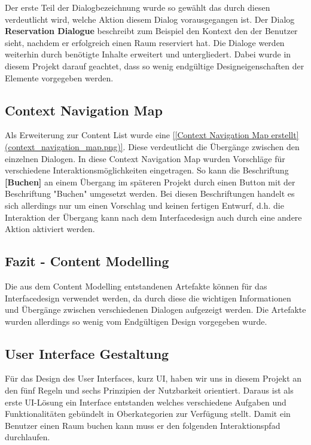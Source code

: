 Der erste Teil der Dialogbezeichnung wurde so gewählt das durch diesen
verdeutlicht wird, welche Aktion diesem Dialog vorausgegangen ist. Der Dialog
\textbf{Reservation Dialogue} beschreibt zum Beispiel den Kontext den der Benutzer
sieht, nachdem er erfolgreich einen Raum reserviert hat.
Die Dialoge werden weiterhin durch benötigte Inhalte erweitert und untergliedert.
Dabei wurde in diesem Projekt darauf geachtet, dass so wenig endgültige
Designeigenschaften der Elemente vorgegeben werden.

\subsection{Context Navigation Map}
\label{sec:Context_Navigation_Map}

Als Erweiterung zur Content List wurde eine \ref{[Context Navigation Map erstellt](context_navigation_map.png)}.
Diese verdeutlicht die Übergänge zwischen den einzelnen Dialogen. In diese
Context Navigation Map wurden Vorschläge für verschiedene
Interaktionsmöglichkeiten eingetragen. So kann die Beschriftung \textbf{[Buchen]} an
einem Übergang im späteren Projekt durch einen Button mit der Beschriftung
"Buchen" umgesetzt werden. Bei diesen Beschriftungen handelt es sich allerdings
nur um einen Vorschlag und keinen fertigen Entwurf, d.h. die Interaktion \bzw
der Übergang kann nach dem Interfacedesign auch durch eine andere Aktion
aktiviert werden.


\subsection{Fazit - Content Modelling}
\label{sec:Fazit_Content_Modelling}

Die aus dem Content Modelling entstandenen Artefakte können für das
Interfacedesign verwendet werden, da durch diese die wichtigen Informationen
und Übergänge zwischen verschiedenen Dialogen aufgezeigt werden. Die Artefakte
wurden allerdings so wenig vom Endgültigen Design vorgegeben wurde.


\subsection{User Interface Gestaltung}
\label{sec:User_Interface_Gestaltung}

Für das Design des User Interfaces, kurz UI, haben wir uns in diesem Projekt an
den fünf Regeln und sechs Prinzipien der Nutzbarkeit \citep{softwareForUse}
orientiert. Daraus ist als erste UI-Lösung ein Interface entstanden welches
verschiedene Aufgaben und Funktionalitäten gebündelt in Oberkategorien zur
Verfügung stellt. Damit ein Benutzer \zB einen Raum buchen kann muss er den
folgenden Interaktionspfad durchlaufen.


